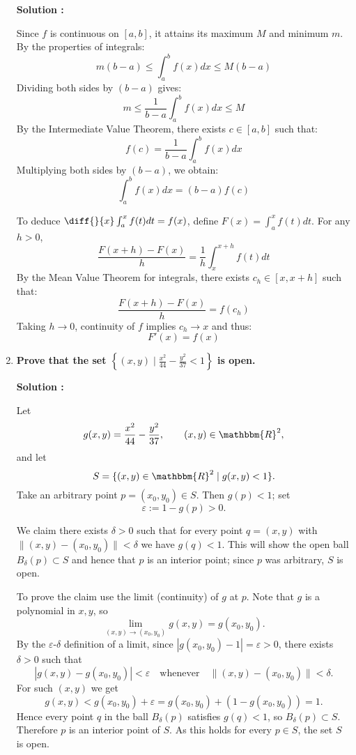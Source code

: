 \documentclass[14pt]{extarticle}
\begin{document}
\begin{enumerate}
\textbf{Solution :}

Since $f$ is continuous on $[a,b]$, it attains its maximum $M$ and minimum $m$. By the properties of integrals:
\[m(b-a) \leq \int_a^b f(x)dx \leq M(b-a)\]
Dividing both sides by $(b-a)$ gives:
\[m \leq \frac{1}{b-a}\int_a^b f(x)dx \leq M\]
By the Intermediate Value Theorem, there exists $c \in [a,b]$ such that:
\[f(c) = \frac{1}{b-a}\int_a^b f(x)dx\]
Multiplying both sides by $(b-a)$, we obtain:
\[\boxed{\int_a^b f(x)dx = (b-a)f(c)}\]

To deduce $\diff{}{x}\int_a^x f(t)dt = f(x)$, define $F(x) = \int_a^x f(t)dt$. For any $h>0$,
\[\frac{F(x+h)-F(x)}{h} = \frac{1}{h}\int_x^{x+h} f(t)dt\]
By the Mean Value Theorem for integrals, there exists $c_h \in [x,x+h]$ such that:
\[\frac{F(x+h)-F(x)}{h} = f(c_h)\]
Taking $h\to0$, continuity of $f$ implies $c_h\to x$ and thus:
\[\boxed{F'(x) = f(x)}\]

\newpage

\item \textbf{Prove that the set $\left\{(x,y)\mid \frac{x^2}{44}-\frac{y^2}{37}<1\right\}$ is open.}

\textbf{Solution :}

Let
\[
g(x,y)=\frac{x^2}{44}-\frac{y^2}{37},\qquad (x,y)\in\mathbbm{R}^2,
\]
and let
\[
S=\{(x,y)\in\mathbbm{R}^2\mid g(x,y)<1\}.
\]
Take an arbitrary point \(p=(x_0,y_0)\in S\). Then \(g(p)<1\); set
\[
\varepsilon := 1 - g(p) > 0.
\]

We claim there exists \(\delta>0\) such that for every point \(q=(x,y)\) with \(\|(x,y)-(x_0,y_0)\|<\delta\) we have \(g(q)<1\). This will show the open ball \(B_\delta(p)\subset S\) and hence that \(p\) is an interior point; since \(p\) was arbitrary, \(S\) is open.

To prove the claim use the limit (continuity) of \(g\) at \(p\). Note that \(g\) is a polynomial in \(x,y\), so
\[
\lim_{(x,y)\to(x_0,y_0)} g(x,y) = g(x_0,y_0).
\]
By the \(\varepsilon\)-\(\delta\) definition of a limit, since \(|g(x_0,y_0)-1|=\varepsilon>0\), there exists \(\delta>0\) such that
\[
|g(x,y)-g(x_0,y_0)|<\varepsilon \quad\text{whenever}\quad \|(x,y)-(x_0,y_0)\|<\delta.
\]
For such \((x,y)\) we get
\[
g(x,y) < g(x_0,y_0) + \varepsilon = g(x_0,y_0) + (1-g(x_0,y_0)) = 1.
\]
Hence every point \(q\) in the ball \(B_\delta(p)\) satisfies \(g(q)<1\), so \(B_\delta(p)\subset S\). Therefore \(p\) is an interior point of \(S\). As this holds for every \(p\in S\), the set \(S\) is open.


\end{enumerate}
\end{document}
